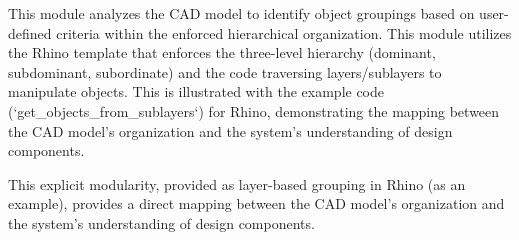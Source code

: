 \documentclass[12pt]{report}
\begin{document}
This module analyzes the CAD model to identify object groupings based on user-defined criteria within the enforced hierarchical organization. This module utilizes the Rhino template that enforces the three-level hierarchy (dominant, subdominant, subordinate) and the code traversing layers/sublayers to manipulate objects.  This is illustrated with the example code (`get\_objects\_from\_sublayers`) for Rhino, demonstrating the mapping between the CAD model's organization and the system's understanding of design components.



This explicit modularity, provided as layer-based grouping in Rhino (as an example), provides a direct mapping between the CAD model's organization and the system's understanding of design components.





\end{document}

